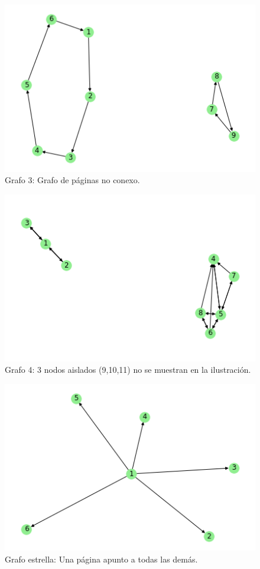 \begin{figure}
   \begin{center}
     \includegraphics{img/prueba_3_no_conexa.png} 
  \end{center}
\caption{Grafo 3: Grafo de páginas no conexo.} \label{fig:exp3-noconexo}
\end{figure}

\begin{figure}
   \begin{center}
     \includegraphics{img/prueba_aislado.png} 
  \end{center}
\caption{Grafo 4: 3 nodos aislados (9,10,11) no se muestran en la ilustración.} \label{fig:exp3-aislado}
\end{figure}

\begin{figure}
   \begin{center}
     \includegraphics{img/prueba_estrella.png} 
  \end{center}
\caption{Grafo estrella: Una página apunto a todas las demás.} \label{fig:exp3-estrella}
\end{figure}

